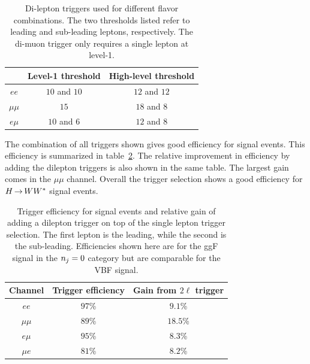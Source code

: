 \begin{table}[h!]
\centering
\captionsetup{justification=centering}

\hspace{-10pt}
\begin{tabular}{|c|c|c|}
\hline
 & Level-1 threshold & High-level threshold \\ \hline \hline
$ee$ & $10$ and $10$ & $12$ and $12$ \\ \hline
$\mu\mu$ & $15$ & $18$ and $8$ \\ \hline
$e\mu$ & $10$ and $6$ & $12$ and $8$ \\ \hline
\end{tabular}

\caption{
Di-lepton triggers used for different flavor combinations. The two thresholds listed refer to leading and sub-leading leptons, respectively. The di-muon trigger only requires a single lepton at level-1. 
}
\label{tab:dilepton-trig}
\end{table}

The combination of all triggers shown gives good efficiency for signal events. This efficiency is summarized in table~\ref{tab:trigeff}. The relative improvement in efficiency by adding the dilepton triggers is also shown in the same table. The largest gain comes in the $\mu\mu$ channel. Overall the trigger selection shows a good efficiency for $H{\,{\rightarrow}\,}WW^\ast$ signal events.

\begin{table}[h!]
\centering
\captionsetup{justification=centering}

\hspace{-10pt}
\begin{tabular}{|c|c|c|}
\hline
Channel & Trigger efficiency & Gain from $2\ell$ trigger \\ \hline \hline
$ee$ & $97$\% & $9.1$\% \\ \hline
$\mu\mu$ & $89$\% & $18.5$\% \\ \hline
$e\mu$ & $95$\% & $8.3$\% \\ \hline
$\mu e$ & $81$\% & $8.2$\% \\ \hline


\end{tabular}

\caption{
Trigger efficiency for signal events and relative gain of adding a dilepton trigger on top of the single lepton trigger selection. The first lepton is the leading, while the second is the sub-leading. Efficiencies shown here are for the ggF signal in the $n_j = 0$ category but are comparable for the VBF signal. 
}
\label{tab:trigeff}
\end{table}



